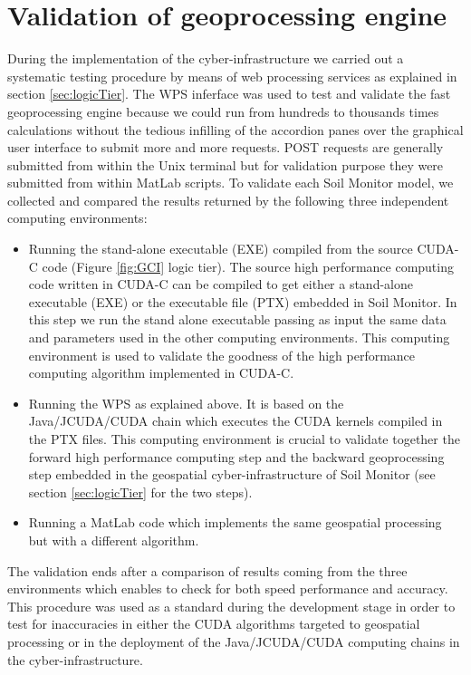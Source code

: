 \documentclass[APA,LATO1COL,doublespace]{WileyNJD-v2}
\begin{document}
\section{Validation of geoprocessing engine}\label{sec:validation}
During the implementation of the 
cyber-infrastructure we carried out a systematic testing procedure by means of web processing services as explained in section \ref{sec:logicTier}.
The WPS inferface was used to test and validate the fast geoprocessing engine because we could run from hundreds to thousands times calculations without the tedious infilling of the accordion panes over the graphical user interface to submit more and more requests.
POST requests are generally submitted from within the Unix terminal but for validation purpose they were submitted from within MatLab scripts. %
To validate each Soil Monitor model, we collected and compared the results returned by the following three independent computing environments:
\begin{itemize}
    \item Running the stand-alone executable (EXE) compiled from the source CUDA-C code (Figure \ref{fig:GCI} logic tier).
    The source high performance computing code written in CUDA-C can be compiled to get either a stand-alone executable (EXE) or the executable file (PTX) embedded in Soil Monitor.
    In this step we run the stand alone executable passing as input the same data and parameters used in the other computing environments.
    This computing environment is used to validate the goodness of the high performance computing algorithm implemented in CUDA-C.
    \item Running the WPS as explained above.
    It is based on the Java/JCUDA/CUDA chain which executes the CUDA kernels compiled in the PTX files. This computing environment is crucial to validate together the forward high performance computing step and the backward geoprocessing step embedded in the geospatial cyber-infrastructure of Soil Monitor (see section \ref{sec:logicTier} for the two steps). 
    \item Running a MatLab code which implements the same geospatial processing but with a different algorithm.
\end{itemize}

The validation ends after a comparison of results coming from the three environments which enables to check for both speed performance and accuracy. 
This procedure was used as a standard during the development stage in order to test for inaccuracies in either the CUDA algorithms targeted to geospatial processing or in the deployment of the Java/JCUDA/CUDA computing chains in the cyber-infrastructure.
\end{document}

